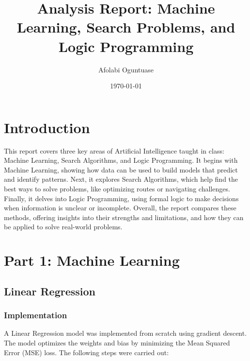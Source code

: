 \documentclass[12pt]{article}
\title{Analysis Report: Machine Learning, Search Problems, and Logic Programming}
\author{Afolabi Oguntuase}
\date{\today}
\begin{document}
\maketitle

\tableofcontents

\newpage

\section{Introduction}
This report covers three key areas of Artificial Intelligence taught in class: Machine Learning, Search Algorithms, and Logic Programming. It begins with Machine Learning, showing how data can be used to build models that predict and identify patterns. Next, it explores Search Algorithms, which help find the best ways to solve problems, like optimizing routes or navigating challenges. Finally, it delves into Logic Programming, using formal logic to make decisions when information is unclear or incomplete. Overall, the report compares these methods, offering insights into their strengths and limitations, and how they can be applied to solve real-world problems.
\newpage
\section{Part 1: Machine Learning}
\subsection{Linear Regression}

\subsubsection{Implementation}

A Linear Regression model was implemented from scratch using gradient descent. The model optimizes the weights and bias by minimizing the Mean Squared Error (MSE) loss. The following steps were carried out:
\end{document}
